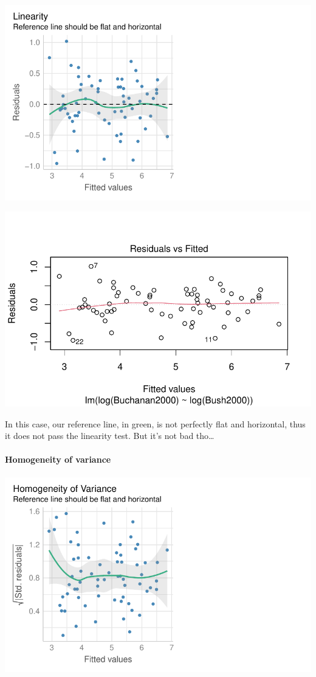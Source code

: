 \documentclass[
  letterpaper,
  DIV=11,
  numbers=noendperiod]{scrartcl}
\let\oldparagraph\paragraph
\renewcommand{\paragraph}[1]{\oldparagraph{#1}\mbox{}}
\begin{document}
\includegraphics{sds-291_s-24_case-study-template_files/figure-pdf/unnamed-chunk-7-1.pdf}

\includegraphics{sds-291_s-24_case-study-template_files/figure-pdf/unnamed-chunk-7-2.pdf}

In this case, our reference line, in green, is not perfectly flat and
horizontal, thus it does not pass the linearity test. But it's not bad
tho\ldots{}

\hypertarget{homogeneity-of-variance}{%
\paragraph{Homogeneity of variance}\label{homogeneity-of-variance}}

\includegraphics{sds-291_s-24_case-study-template_files/figure-pdf/unnamed-chunk-8-1.pdf}
\end{document}
